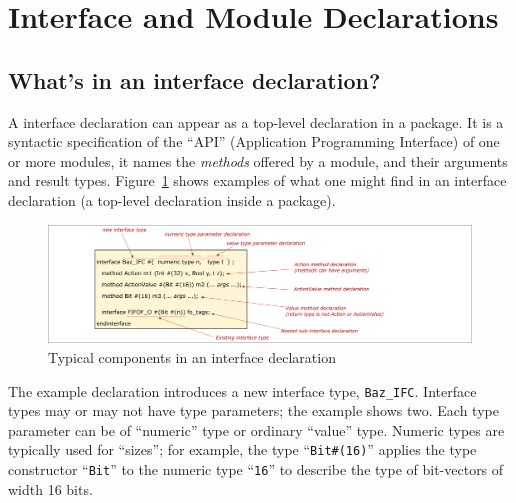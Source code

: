 
\section{Interface and Module Declarations}

\label{Sec_Interface_and_Module_decls}



\subsection{What's in an interface declaration?}

\label{Sec_Whats_in_an_interface_declaration}


A {\BSV} interface declaration can appear as a top-level declaration in a
package.  It is a syntactic specification of the ``API'' (Application
Programming Interface) of one or more {\BSV} modules, {\ie} it names the
\emph{methods} offered by a module, and their arguments and result
types.  Figure~\ref{Fig_BSV_whats_in_an_interface_decl} shows examples
of what one might find in an interface declaration (a top-level
declaration inside a package).
\begin{figure}[htbp]
  \centerline{\includegraphics[width=6in,angle=0]{Figures/Fig_BSV_whats_in_an_interface_decl}}
  \caption{\label{Fig_BSV_whats_in_an_interface_decl}
           Typical components in an interface declaration}
\end{figure}

The example declaration introduces a new interface type,
\verb|Baz_IFC|.  Interface types may or may not have type parameters;
the example shows two.  Each type parameter can be of ``numeric'' type
or ordinary ``value'' type.  Numeric types are typically used for
``sizes''; for example, the type ``\verb|Bit#(16)|'' applies the type
constructor ``\verb|Bit|'' to the numeric type ``\verb|16|'' to
describe the type of bit-vectors of width 16 bits.

